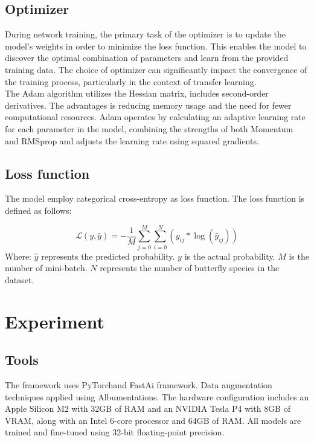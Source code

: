 \documentclass[10pt,twocolumn,letterpaper]{article}
\begin{document}
\subsection{Optimizer}
During network training, the primary task of the optimizer is to update the model's weights in order to minimize the loss function. This enables the model to discover the optimal combination of parameters and learn from the provided training data. The choice of optimizer can significantly impact the convergence of the training process, particularly in the context of transfer learning.\\

\indent The Adam algorithm utilizes the Hessian matrix, includes second-order derivatives. The advantages is reducing memory usage and the need for fewer computational resources\cite{kingma2014adam}. Adam operates by calculating an adaptive learning rate for each parameter in the model, combining the strengths of both Momentum and RMSprop and adjusts the learning rate using squared gradients\cite{zhang2018improved}.


\subsection{ Loss function} 
The model employ categorical cross-entropy as loss function. The loss function is defined as follows:

\begin{equation}
    \mathcal{L}(y,\hat{y}) = -\frac{1}{M}\sum_{j=0}^{M}\sum_{i=0}^{N}(y_{ij} \ast \log(\hat{y}_{ij}))
\end{equation}
Where:
$\hat{y}$ represents the predicted probability.
$y$ is the actual probability.
$M$ is the number of mini-batch.
$N$ represents the number of butterfly species in the dataset.


\section{ Experiment} 
\subsection{Tools} 
The framework uses PyTorch\cite{paszke2019pytorch}and FastAi\cite{howard2020fastai} framework. Data augmentation techniques applied using Albumentations. The hardware configuration includes an Apple Silicon M2 with 32GB of RAM and an NVIDIA Tesla P4 with 8GB of VRAM, along with an Intel 6-core processor and 64GB of RAM. All models are trained and fine-tuned using 32-bit floating-point precision.
\end{document}
